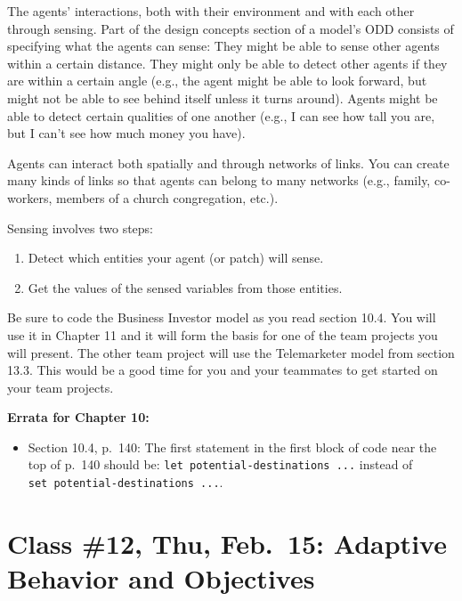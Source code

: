 \documentclass[]{article}
\providecommand{\tightlist}{%
  \setlength{\itemsep}{0pt}\setlength{\parskip}{0pt}}
\begin{document}
The agents' interactions, both with their environment and with each
other through sensing. Part of the design concepts section of a model's
ODD consists of specifying what the agents can sense: They might be able
to sense other agents within a certain distance. They might only be able
to detect other agents if they are within a certain angle (e.g., the
agent might be able to look forward, but might not be able to see behind
itself unless it turns around). Agents might be able to detect certain
qualities of one another (e.g., I can see how tall you are, but I can't
see how much money you have).

Agents can interact both spatially and through networks of links. You
can create many kinds of links so that agents can belong to many
networks (e.g., family, co-workers, members of a church congregation,
etc.).

Sensing involves two steps:

\begin{enumerate}
\def\labelenumi{\arabic{enumi}.}
\tightlist
\item
  Detect which entities your agent (or patch) will sense.
\item
  Get the values of the sensed variables from those entities.
\end{enumerate}

Be sure to code the Business Investor model as you read section 10.4.
You will use it in Chapter 11 and it will form the basis for one of the
team projects you will present. The other team project will use the
Telemarketer model from section 13.3. This would be a good time for you
and your teammates to get started on your team projects.

\textbf{Errata for Chapter 10:}

\begin{itemize}
\tightlist
\item
  Section 10.4, p.~140: The first statement in the first block of code
  near the top of p.~140 should be:
  \texttt{let\ potential-destinations\ ...} instead of
  \texttt{set\ potential-destinations\ ...}.
\end{itemize}

\hypertarget{class-12-thu-feb.15-adaptive-behavior-and-objectives}{%
\section{Class \#12, Thu, Feb.~15: Adaptive Behavior and
Objectives}\label{class-12-thu-feb.15-adaptive-behavior-and-objectives}}
\end{document}
